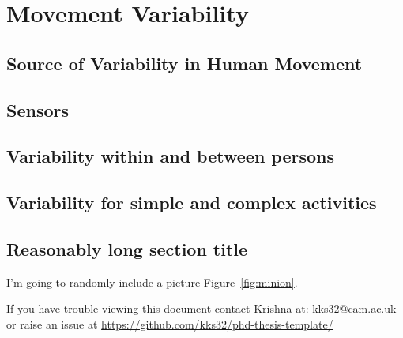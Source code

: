 
\chapter{Movement Variability}

\ifpdf
    \graphicspath{{chapter2/figs/raster/}{chapter2/figs/PDF/}{chapter2/figs/}}
\else
    \graphicspath{{chapter2/figs/vector/}{chapter2/figs/}}
\fi


\section{Source of Variability in Human Movement}
\section{Sensors}
\section{Variability within and between persons}
\section{Variability for simple and complex activities}


\section[Short title]{Reasonably long section title}

I'm going to randomly include a picture Figure~\ref{fig:minion}.


If you have trouble viewing this document contact Krishna at: \href{mailto:kks32@cam.ac.uk}{kks32@cam.ac.uk} or raise an issue at \url{https://github.com/kks32/phd-thesis-template/}


